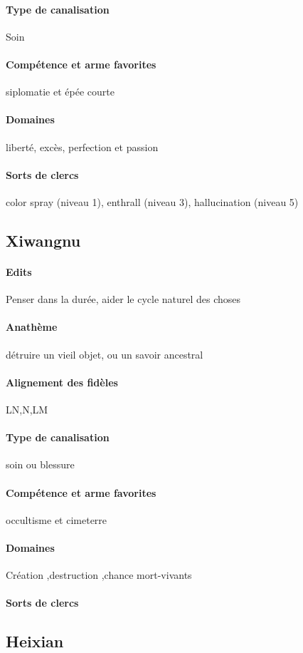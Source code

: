 \documentclass[10pt,a4paper]{book}
\begin{document}
\paragraph{Type de canalisation}Soin
\paragraph{Compétence et arme favorites}siplomatie et épée courte
\paragraph{Domaines}liberté, excès, perfection et passion
\paragraph{Sorts de clercs}color spray (niveau 1), enthrall (niveau 3), hallucination (niveau 5)
\subsection{Xiwangnu}
\paragraph{Edits}Penser dans la durée, aider le cycle naturel des choses
\paragraph{Anathème}détruire un vieil objet, ou un savoir ancestral
\paragraph{Alignement des fidèles} LN,N,LM
\paragraph{Type de canalisation}soin ou blessure
\paragraph{Compétence et arme favorites}occultisme et cimeterre
\paragraph{Domaines}Création ,destruction ,chance mort-vivants
\paragraph{Sorts de clercs}
\subsection{Heixian}
\end{document}
